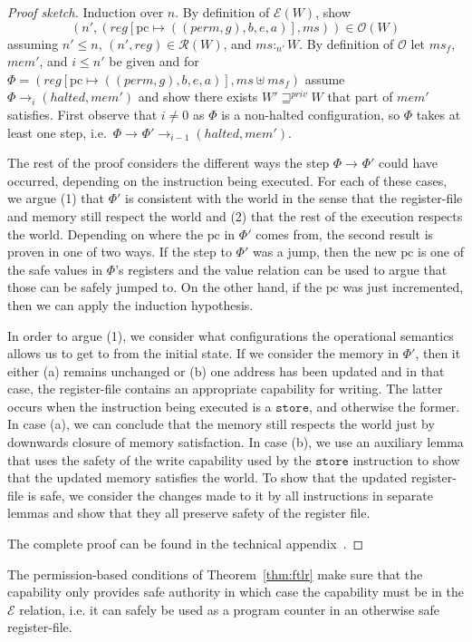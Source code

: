\documentclass[format=acmsmall, review=true, screen=true]{acmart}
\newcommand{\update}[2]{[#1 \mapsto #2]}
\newcommand{\var}[1]{\mathit{#1}}
\newcommand{\hs}{\var{ms}}
\newcommand{\ms}{\hs}
\newcommand{\gl}{\var{g}}
\newcommand{\pcreg}{\mathrm{pc}}
\newcommand{\addr}{\var{a}}
\newcommand{\start}{\var{b}}
\newcommand{\addrend}{\var{e}}
\newcommand{\mem}{\var{mem}}
\newcommand{\reg}{\var{reg}}
\newcommand{\heap}{\var{mem}}
\newcommand{\perm}{\var{perm}}
\newcommand{\halted}{\mathit{halted}}
\newcommand{\futurestr}{\mathbin{\sqsupseteq}^{\var{priv}}}
\newcommand{\heapSat}[3][\heap]{#1 :_{#2} #3}
\newcommand{\asmType}{\plaindom{AsmType}}
\newcommand{\plaindom}[1]{\mathrm{#1}}
\newcommand{\intr}[2]{\mathcal{#1}}
\newcommand{\exprintr}[1]{\intr{E}{#1}}
\newcommand{\regintr}[1]{\intr{R}{#1}}
\newcommand{\stder}{\exprintr{\asmType}}
\newcommand{\stdrr}{\regintr{\asmType}}
\newcommand{\observations}{\mathcal{O}}
\newcommand{\npair}[2][n]{\left(#1,#2 \right)}
\newcommand{\step}[1][]{\rightarrow_{#1}}
\newenvironment{toplas}%
    {\color{OliveGreen}}{}
\begin{document}
\begin{toplas}
  \begin{proof}[Proof sketch]
    Induction over $n$. By definition of $\stder(W)$, show
    \[
      \npair[n']{(\reg\update{\pcreg}{((\perm,\gl),\start,\addrend,\addr)},\ms)}
      \in \observations(W)
    \]
    assuming $n' \leq n$, $\npair[n']{\reg} \in \stdrr(W)$, and
    $\heapSat[\ms]{n'}{W}$. By definition of $\observations$ let $\ms_f$,
    $\mem'$, and $i \leq n'$ be given and for
    $\Phi = (\reg\update{\pcreg}{((\perm,\gl),\start,\addrend,\addr)},\ms \uplus
    \ms_f)$ assume $\Phi \step[i]
    (\halted,\mem')$ and show there exists $W' \futurestr W$ that part of
    $\mem'$ satisfies. First observe that $i \neq 0$ as $\Phi$ is a non-halted
    configuration, so $\Phi$ takes at least one step, i.e.\ $\Phi \step
    \Phi' \step[i-1] (\halted,\mem')$.

    The rest of the proof considers the different ways the step $\Phi \step
    \Phi'$ could have occurred, depending on the instruction being executed. For
    each of these cases, we argue (1) that $\Phi'$ is consistent with the world
    in the sense that the register-file and memory still respect the world and
    (2) that the rest of the execution respects the world. Depending on where
    the $\pcreg$ in $\Phi'$ comes from, the second result is proven in one of
    two ways. If the step to $\Phi'$ was a jump, then the new $\pcreg$ is one of
    the safe values in $\Phi$'s registers and the value relation can be used to
    argue that those can be safely jumped to. On the other hand, if the $\pcreg$
    was just incremented, then we can apply the induction hypothesis.

    In order to argue (1), we consider what configurations the operational
    semantics allows us to get to from the initial state. If we consider the
    memory in $\Phi'$, then it either (a) remains unchanged or (b) one address
    has been updated and in that case, the register-file contains an appropriate
    capability for writing. The latter occurs when the instruction being
    executed is a $\texttt{store}$, and otherwise the former. In case (a), we
    can conclude that the memory still respects the world just by downwards
    closure of memory satisfaction. In case (b), we use an auxiliary lemma that
    uses the safety of the write capability used by the $\texttt{store}$
    instruction to show that the updated memory satisfies the world. To show
    that the updated register-file is safe, we consider the changes made to it
    by all instructions in separate lemmas and show that they all preserve
    safety of the register file.

    The complete proof can be found in the technical appendix~\citep{technical_appendix}.
  \end{proof}
\end{toplas}
The permission-based conditions of Theorem~\ref{thm:ftlr} make sure that the
capability only provides safe authority in which case the capability must be in
the $\stder$ relation, i.e. it can safely be used as a program counter in an
otherwise safe register-file.
\end{document}
